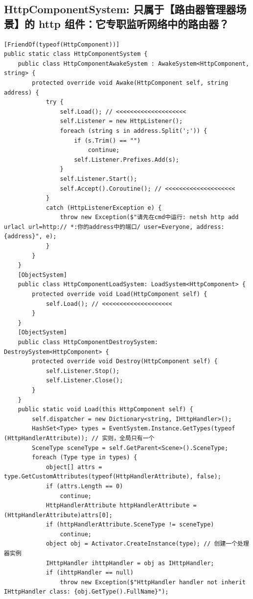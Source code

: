 \documentclass[9pt, b5paper]{article}
\begin{document}
\subsection{HttpComponentSystem: 只属于【路由器管理器场景】的 http 组件：它专职监听网络中的路由器？}
\label{sec:org759752f}
\begin{verbatim}
[FriendOf(typeof(HttpComponent))]
public static class HttpComponentSystem {
    public class HttpComponentAwakeSystem : AwakeSystem<HttpComponent, string> {
        protected override void Awake(HttpComponent self, string address) {
            try {
                self.Load(); // <<<<<<<<<<<<<<<<<<<< 
                self.Listener = new HttpListener();
                foreach (string s in address.Split(';')) {
                    if (s.Trim() == "") 
                        continue;
                    self.Listener.Prefixes.Add(s);
                }
                self.Listener.Start();
                self.Accept().Coroutine(); // <<<<<<<<<<<<<<<<<<<< 
            }
            catch (HttpListenerException e) {
                throw new Exception($"请先在cmd中运行: netsh http add urlacl url=http:// *:你的address中的端口/ user=Everyone, address: {address}", e);
            }
        }
    }
    [ObjectSystem]
    public class HttpComponentLoadSystem: LoadSystem<HttpComponent> {
        protected override void Load(HttpComponent self) {
            self.Load(); // <<<<<<<<<<<<<<<<<<<< 
        }
    }
    [ObjectSystem]
    public class HttpComponentDestroySystem: DestroySystem<HttpComponent> {
        protected override void Destroy(HttpComponent self) {
            self.Listener.Stop();
            self.Listener.Close();
        }
    }
    public static void Load(this HttpComponent self) {
        self.dispatcher = new Dictionary<string, IHttpHandler>();
        HashSet<Type> types = EventSystem.Instance.GetTypes(typeof (HttpHandlerAttribute)); // 实则，全局只有一个
        SceneType sceneType = self.GetParent<Scene>().SceneType;
        foreach (Type type in types) {
            object[] attrs = type.GetCustomAttributes(typeof(HttpHandlerAttribute), false);
            if (attrs.Length == 0) 
                continue;
            HttpHandlerAttribute httpHandlerAttribute = (HttpHandlerAttribute)attrs[0];
            if (httpHandlerAttribute.SceneType != sceneType) 
                continue;
            object obj = Activator.CreateInstance(type); // 创建一个处理器实例
            IHttpHandler ihttpHandler = obj as IHttpHandler;
            if (ihttpHandler == null) 
                throw new Exception($"HttpHandler handler not inherit IHttpHandler class: {obj.GetType().FullName}");

\end{verbatim}
\end{document}
